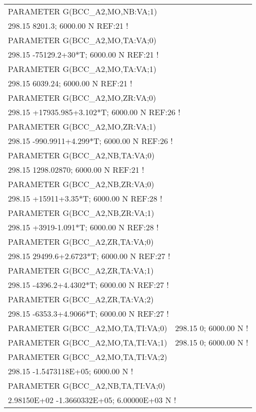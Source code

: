\begin{longtable}[H]{ l l l }
	PARAMETER G(BCC\_A2,MO,NB:VA;1) & & \\
	\multicolumn{3}{l}{298.15 8201.3; 6000.00 N REF:21 !}\\
	PARAMETER G(BCC\_A2,MO,TA:VA;0) & & \\
	\multicolumn{3}{l}{298.15 -75129.2+30*T; 6000.00 N REF:21 !
}\\
	PARAMETER G(BCC\_A2,MO,TA:VA;1) & & \\
	\multicolumn{3}{l}{298.15 6039.24; 6000.00 N REF:21 !}\\
	PARAMETER G(BCC\_A2,MO,ZR:VA;0) & & \\
	\multicolumn{3}{l}{298.15 +17935.985+3.102*T; 6000.00 N REF:26 !}\\
	PARAMETER G(BCC\_A2,MO,ZR:VA;1)  & & \\
	\multicolumn{3}{l}{298.15  -990.9911+4.299*T; 6000.00 N REF:26 !}\\
	PARAMETER G(BCC\_A2,NB,TA:VA;0) & & \\
	\multicolumn{3}{l}{298.15 1298.02870; 6000.00 N REF:21 !}\\
	PARAMETER G(BCC\_A2,NB,ZR:VA;0) & & \\
	\multicolumn{3}{l}{298.15  +15911+3.35*T; 6000.00 N REF:28 !}\\
	PARAMETER G(BCC\_A2,NB,ZR:VA;1) & & \\
	\multicolumn{3}{l}{298.15 +3919-1.091*T; 6000.00 N REF:28 !}\\
	PARAMETER G(BCC\_A2,ZR,TA:VA;0) & & \\
	\multicolumn{3}{l}{298.15 29499.6+2.6723*T; 6000.00 N REF:27 !}\\
	PARAMETER G(BCC\_A2,ZR,TA:VA;1) & & \\
	\multicolumn{3}{l}{298.15 -4396.2+4.4302*T; 6000.00 N REF:27 !}\\
	PARAMETER G(BCC\_A2,ZR,TA:VA;2) & &\\
	\multicolumn{3}{l}{298.15 -6353.3+4.9066*T; 6000.00 N REF:27 !}\\
	PARAMETER G(BCC\_A2,MO,TA,TI:VA;0) & \multicolumn{2}{l}{298.15   0; 6000.00  N !}\\
	PARAMETER G(BCC\_A2,MO,TA,TI:VA;1) & \multicolumn{2}{l}{298.15   0; 6000.00  N !}\\
	PARAMETER G(BCC\_A2,MO,TA,TI:VA;2) & & \\
	\multicolumn{3}{l}{298.15   -1.5473118E+05; 6000.00  N !}\\
	PARAMETER G(BCC\_A2,NB,TA,TI:VA;0) & & \\
	\multicolumn{3}{l}{2.98150E+02  -1.3660332E+05; 6.00000E+03  N !}\\

\end{longtable}
